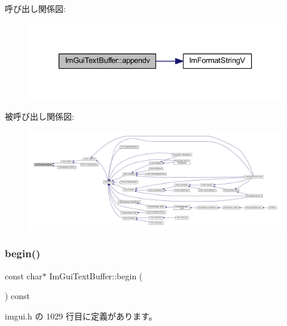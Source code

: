呼び出し関係図\+:\nopagebreak
\begin{figure}[H]
\begin{center}
\leavevmode
\includegraphics[width=333pt]{struct_im_gui_text_buffer_ad7c7e0d7ec1a12dd2a96a3dbb204deaf_cgraph}
\end{center}
\end{figure}
被呼び出し関係図\+:
\nopagebreak
\begin{figure}[H]
\begin{center}
\leavevmode
\includegraphics[width=350pt]{struct_im_gui_text_buffer_ad7c7e0d7ec1a12dd2a96a3dbb204deaf_icgraph}
\end{center}
\end{figure}
\mbox{\label{struct_im_gui_text_buffer_aab6d83c6b9a8061287a4cb6135c1cab4}} 
\subsubsection{\texorpdfstring{begin()}{begin()}}
{\footnotesize\ttfamily const char$\ast$ Im\+Gui\+Text\+Buffer\+::begin (\begin{DoxyParamCaption}{ }\end{DoxyParamCaption}) const\hspace{0.3cm}{\ttfamily [inline]}}



 imgui.\+h の 1029 行目に定義があります。

